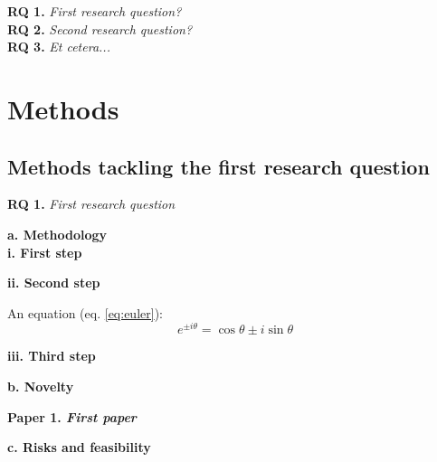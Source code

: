 \documentclass[a4paper,12pt]{article}
\begin{document}
    \textbf{RQ 1.}	\emph{First research question?}\\
    
    \textbf{RQ 2.}	\emph{Second research question?}\\
    
    \textbf{RQ 3.}	\emph{Et cetera...}\\

    \newpage
    \section{Methods}
	\subsection{Methods tackling the first research question}
	
	\vspace*{10mm}
	
\begin{tcolorbox}[minipage,colback=columbiablue,arc=10pt,outer arc=10pt]
\centering
\textbf{RQ 1.}	\emph{First research question}
\end{tcolorbox}

    \vspace*{10mm}

    
    \noindent \textbf{a. Methodology}\\ [0.1 cm]

    \textbf{i. First step}
    
    \textbf{ii. Second step} 	
    \vspace*{5mm}
     
  An equation (eq. \ref{eq:euler}):
  \begin{equation} \label{eq:euler}
  e^{ \pm i\theta } = \cos \theta \pm i\sin \theta
  \end{equation}
  
    \textbf{iii. Third step}
	\vspace*{5mm}
	
	
	\noindent \textbf{b. Novelty}\\ [0.1 cm] 
	    
\begin{tcolorbox}[minipage,colback=mossgreen,arc=10pt,outer arc=10pt]
\centering
\textbf{Paper 1. \emph{First paper}}
\end{tcolorbox}
    
    \vspace*{5mm}
    
    \noindent \textbf{c. Risks and feasibility}\\ [0.1 cm] 
\end{document}
